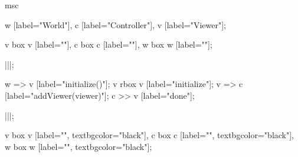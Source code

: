 \begin{msc}
msc
{

w [label="World"],
c [label="Controller"],
v [label="Viewer"];

v box v [label=""],
c box c [label=""],
w box w [label=""];

|||;

w => v [label="initialize()"];
v rbox v [label="initialize"];
v => c [label="addViewer(viewer)"];
c >> v [label="done"];

|||;

v box v [label="", textbgcolor="black"],
c box c [label="", textbgcolor="black"],
w box w [label="", textbgcolor="black"];

}
\end{msc}
